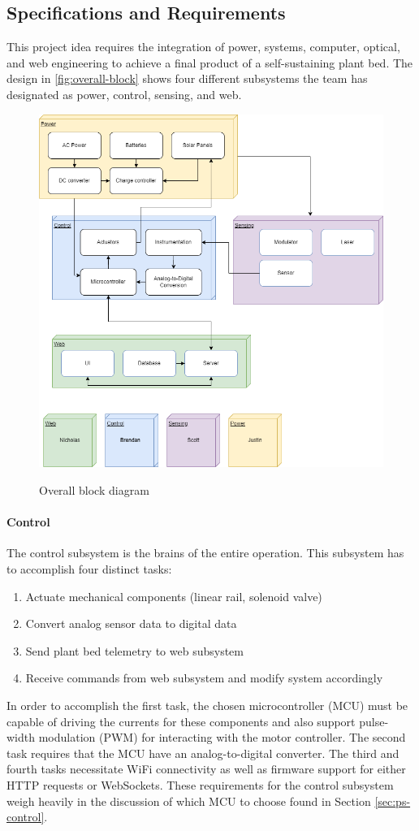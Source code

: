 \subsection{Specifications and Requirements}
This project idea requires the integration of power, systems, computer, optical, and web engineering to achieve a final product of a self-sustaining plant bed. The design in \autoref{fig:overall-block} shows four different subsystems the team has designated as power, control, sensing, and web.
\begin{figure}[H]
    \caption{Overall block diagram}
    \centering
    \includegraphics[width=\textwidth]{images/Overall Block Diagram.png}
    \label{fig:overall-block}
\end{figure}
\paragraph{Control}
The control subsystem is the brains of the entire operation. This subsystem has to accomplish four distinct tasks:
\begin{enumerate}
    \item Actuate mechanical components (linear rail, solenoid valve)
    \item Convert analog sensor data to digital data
    \item Send plant bed telemetry to web subsystem
    \item Receive commands from web subsystem and modify system accordingly
\end{enumerate}
In order to accomplish the first task, the chosen microcontroller (MCU) must be capable of driving the currents for these components and also support pulse-width modulation (PWM) for interacting with the motor controller. The second task requires that the MCU have an analog-to-digital converter. The third and fourth tasks necessitate WiFi connectivity as well as firmware support for either HTTP requests or WebSockets. These requirements for the control subsystem weigh heavily in the discussion of which MCU to choose found in Section \ref{sec:ps-control}.
